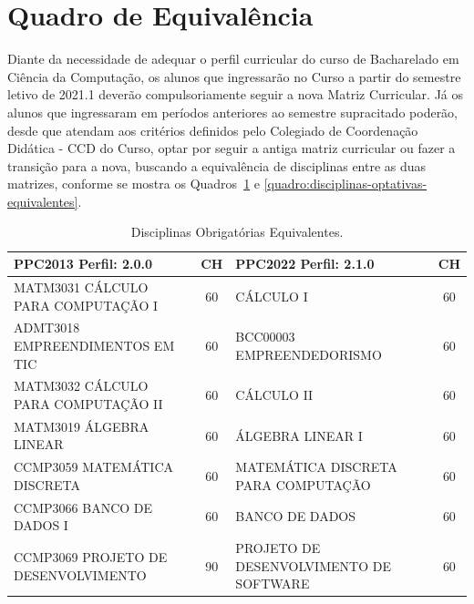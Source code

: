 \documentclass[
	12pt,				%
	openright,			%
  oneside,     %
	a4paper,			%
	chapter=TITLE,		%
	english,			%
	french,				%
	spanish,			%
	brazil				%
	]{abntex2}
\begin{document}
  \section{Quadro de Equivalência}
  
  Diante da necessidade de adequar o perfil curricular do curso de Bacharelado em Ciência da Computação, os alunos que ingressarão no Curso a partir do semestre letivo de 2021.1 deverão compulsoriamente seguir a nova Matriz Curricular. Já os alunos que ingressaram em períodos anteriores ao semestre supracitado poderão, desde que atendam aos critérios definidos pelo Colegiado de Coordenação Didática - CCD do Curso, optar por seguir a antiga matriz curricular ou fazer a transição para a nova, buscando a equivalência de disciplinas entre as duas matrizes, conforme se mostra os Quadros~\ref{quadro:disciplinas-obrigatorias-equivalentes} e \ref{quadro:disciplinas-optativas-equivalentes}. 
  
  \begin{center}
    
    \begin{tiny}
      \begin{longtable}{p{6.5cm}cp{6.5cm}c}
        \caption{\label{quadro:disciplinas-obrigatorias-equivalentes}Disciplinas Obrigatórias Equivalentes.}\\
      \toprule
      \textbf{PPC2013 Perfil: 2.0.0} & \textbf{CH} & \textbf{PPC2022 Perfil: 2.1.0} & \textbf{CH}\\
      \midrule
      MATM3031 CÁLCULO PARA COMPUTAÇÃO I  & 60 & CÁLCULO I & 60 \\ \midrule
      ADMT3018 EMPREENDIMENTOS EM TIC & 60 & BCC00003 EMPREENDEDORISMO & 60 \\ \midrule
      MATM3032 CÁLCULO PARA COMPUTAÇÃO II  & 60 & CÁLCULO II & 60 \\ \midrule
      MATM3019 ÁLGEBRA LINEAR  & 60 & ÁLGEBRA LINEAR I & 60 \\ \midrule
      CCMP3059 MATEMÁTICA DISCRETA  & 60 & MATEMÁTICA DISCRETA PARA COMPUTAÇÃO & 60 \\ \midrule
      CCMP3066 BANCO DE DADOS I & 60 & BANCO DE DADOS & 60 \\ \midrule
      CCMP3069 PROJETO DE DESENVOLVIMENTO & 90 & PROJETO DE DESENVOLVIMENTO DE SOFTWARE & 60 \\
  \bottomrule
  \end{longtable}
  \end{tiny}
  \end{center}
  
\end{document}

